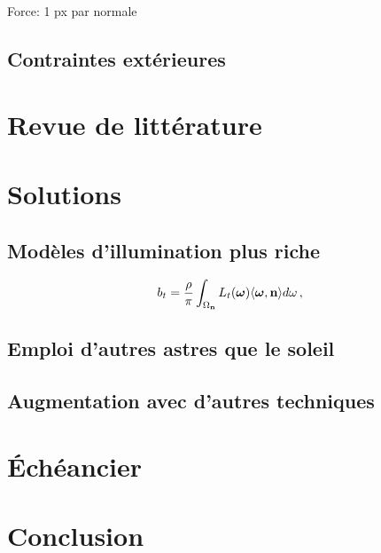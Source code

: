 \documentclass{report}
\begin{document}
Force: 1 px par normale

\section{Contraintes extérieures}


\chapter{Revue de littérature}

\cite{Hold-Geoffroy-3DV15,Hold-Geoffroy-ICCP15}


\chapter{Solutions}

\section{Modèles d'illumination plus riche}

\begin{equation}
b_t = \frac{\rho}{\pi} \int_{\Omega_{\bf n}} L_t(\mathbf{\boldsymbol \omega}) \langle \boldsymbol \omega, {\bf n} \rangle d\omega \,,
\end{equation}

\section{Emploi d'autres astres que le soleil}

\section{Augmentation avec d'autres techniques}


\chapter{Échéancier}


\chapter{Conclusion}\label{conclusion}


{\small
%

}
\end{document}
